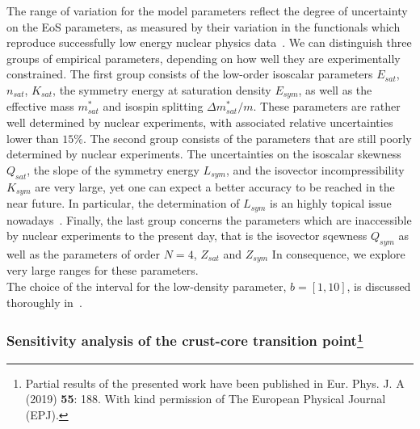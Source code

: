 The range of variation for the model parameters reflect the degree of 
uncertainty on the EoS parameters, as measured by their variation in the 
functionals which reproduce successfully low energy nuclear physics
data~\cite{Margueron2018a}. We can distinguish three groups of empirical  
parameters, depending on how well they are experimentally constrained. The 
first group consists of the low-order isoscalar parameters $E_{sat}$, 
$n_{sat}$, $K_{sat}$, the symmetry energy at saturation density $E_{sym}$, as 
well as the effective mass $m_{sat}^*$ and isospin splitting 
$\Delta m_{sat}^*/m$. These parameters are rather well determined by nuclear 
experiments, with associated relative uncertainties lower than $15\%$. The 
second group consists of the parameters that are still poorly determined by 
nuclear experiments. The uncertainties on the isoscalar skewness $Q_{sat}$, the 
slope of the symmetry energy $L_{sym}$, and the isovector incompressibility 
$K_{sym}$ are very large, yet one can expect a better accuracy to be 
reached in the near future. In particular, the determination of $L_{sym}$ is 
an highly topical issue nowadays~\cite{Li2014}. Finally, the last group 
concerns the parameters which are inaccessible by nuclear experiments to the 
present day, that is the isovector sqewness $Q_{sym}$ as well as the parameters 
of order $N=4$, $Z_{sat}$ and $Z_{sym}$ In consequence, we explore very large 
ranges for these parameters.\\
The choice of the interval for the low-density parameter, $b = [1,10]$, is 
discussed thoroughly in~\cite{Antic2019}.

\subsubsection{Sensitivity analysis of the crust-core transition
point\footnote{Partial results of the presented work have been published in 
Eur. Phys. J. A (2019) \textbf{55}: 188. With kind permission of The European
Physical Journal (EPJ).}}\label{subsubsec:sensana}


